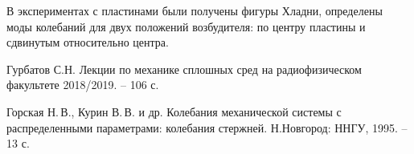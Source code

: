 \documentclass[a4paper,14pt]{extarticle}
\begin{document}
В экспериментах с пластинами были получены фигуры Хладни, определены моды колебаний для двух положений возбудителя: по центру пластины и сдвинутым относительно центра.

\begin{thebibliography}{}
   Гурбатов С.Н. Лекции по механике сплошных сред на радиофизическом факультете 2018/2019. -- 106 с.
  
   Горская Н.\,В., Курин В.\,В. и др. Колебания механической системы с распределенными параметрами: колебания стержней. Н.Новгород: ННГУ, 1995. -- 13 с.
  
\end{thebibliography}
\end{document}

